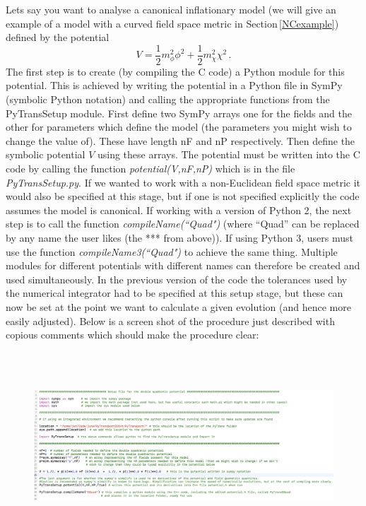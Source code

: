\documentclass[10pt,
amsmath,amssymb,
aps,prd,nofootinbib,eqsecnum,a4paper]{revtex4}
\def\be{\begin{equation}}
\def\ee{\end{equation}}
\newcommand{\CC}{C\nolinebreak\hspace{-.05em}\raisebox{.4ex}{\tiny\bf +}\nolinebreak\hspace{-.10em}\raisebox{.4ex}{\tiny\bf +}}
\def\CC{{C\nolinebreak[4]\hspace{-.05em}\raisebox{.4ex}{\tiny\bf ++}}}
\def\S{ }
\begin{document}
Lets say you want to analyse a canonical inflationary model (we will give an 
example of a model with a curved field space metric in Section\,\ref{NCexample})
defined by the potential \be
\label{dubquadpot}
V=\frac{1}{2} m^2_{\phi} \phi^2 + \frac{1}{2} m^2_{\chi} \chi^2\,.
\ee
The first step is to create (by compiling the \CC \S  code) a Python module for this potential. This is achieved by writing 
the potential in a Python file in SymPy (symbolic Python notation) and calling the 
appropriate functions from the { PyTransSetup module}. First define two SymPy 
arrays one for the fields and the other for parameters which 
define the model (the parameters you might wish to change the value of). 
These have length nF and nP respectively. 
Then define the symbolic potential $V$ using these arrays. The potential must be written into the 
\CC \S  code by calling the function {\it potential(V,nF,nP)}  which is in the file {\it PyTransSetup.py}.  If we 
wanted to work with a non-Euclidean field space metric it would also be specified at this stage, but if one is not specified explicitly 
the code assumes the model is canonical.
If working with a version of Python 2,  the next step is to call the function {\it compileName(``Quad")} (where ``Quad'' can be replaced by any name the user likes (the *** from above)). 
If using Python 3, users must use the function {\it compileName3(``Quad")}
to achieve the same thing. 
Multiple modules for different potentials with different names can therefore be created and 
used simultaneously. In the previous version of the code the tolerances used by the numerical 
integrator had to be specified at this setup stage, but these can now be set 
at the point we want to calculate a given evolution (and hence more easily adjusted). 
Below is a screen shot of the procedure just described with copious comments which should 
make the procedure clear:

\begin{figure}[H]
\centering
\includegraphics[width=18.0cm,height=7cm]{shot1c2}
\end{figure}
\end{document}
